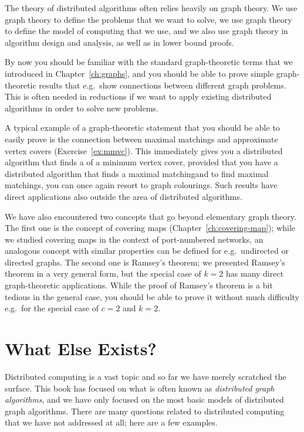 The theory of distributed algorithms often relies heavily on graph theory. We use graph theory to define the problems that we want to solve, we use graph theory to define the model of computing that we use, and we also use graph theory in algorithm design and analysis, as well as in lower bound proofs.

By now you should be familiar with the standard graph-theoretic terms that we introduced in Chapter~\ref{ch:graphs}, and you should be able to prove simple graph-theoretic results that e.g.\ show connections between different graph problems. This is often needed in reductions if we want to apply existing distributed algorithms in order to solve new problems.

A typical example of a graph-theoretic statement that you should be able to easily prove is the connection between maximal matchings and approximate vertex covers (Exercise~\ref{ex:mmvc}). This immediately gives you a distributed algorithm that finds a  of a minimum vertex cover, provided that you have a distributed algorithm that finds a maximal matching\mydash and to find maximal matchings, you can once again resort to graph colourings. Such results have direct applications also outside the area of distributed algorithms.

We have also encountered two concepts that go beyond elementary graph theory. The first one is the concept of covering maps (Chapter~\ref{ch:covering-map}); while we studied covering maps in the context of port-numbered networks, an analogous concept with similar properties can be defined for e.g.\ undirected or directed graphs. The second one is Ramsey's theorem; we presented Ramsey's theorem in a very general form, but the special case of $k = 2$ has many direct graph-theoretic applications. While the proof of Ramsey's theorem is a bit tedious in the general case, you should be able to prove it without much difficulty e.g.\ for the special case of $c = 2$ and $k = 2$.


\section{What Else Exists?}

Distributed computing is a vast topic and so far we have merely scratched the surface. This book has focused on what is often known as \emph{distributed graph algorithms}, and we have only focused on the most basic models of distributed graph algorithms. There are many questions related to distributed computing that we have not addressed at all; here are a few examples.


